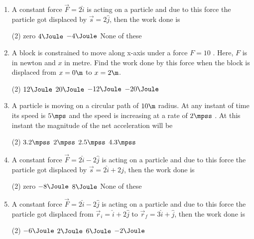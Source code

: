 \documentclass{article}
\begin{document}
\begin{enumerate}
\item A constant force $\vec{F}=2\hat{i}$ is acting on a particle and due to this force the particle got displaced by $\vec{s}=2\hat{j}$, then the work done is
\begin{tasks}(2)
	\task zero\ans
	\task $4\Joule$
	\task $-4\Joule$
	\task None of these
\end{tasks}

\item A block is constrained to move along x-axis under a force $F = 10$ . Here, $F$ is in newton and $x$ in
metre. Find the work done by this force when the block is displaced from $x = 0 \m$ to $x = 2 \m$.
\begin{center}
\end{center}
\begin{tasks}(2)
	\task $12\Joule$
	\task $20\Joule$\ans
	\task $-12\Joule$
	\task $-20\Joule$
\end{tasks}

\item A particle is moving on a circular path of $10 \m$ radius. At any instant of time its speed is $5 \mps$ and the speed is increasing at a rate of $2 \mpss$ . At this instant the magnitude of the net acceleration will be
\begin{tasks}(2)
	\task $3.2\mpss$\ans
	\task $2\mpss$
	\task $2.5\mpss$
	\task $4.3\mpss$
\end{tasks}

\item A constant force $\vec{F}=2\hat{i} - 2\hat{j}$ is acting on a particle and due to this force the particle got displaced by $\vec{s}=2\hat{i} + 2\hat{j}$, then the work done is
\begin{tasks}(2)
	\task zero\ans
	\task $-8\Joule$
	\task $8\Joule$
	\task None of these
\end{tasks}

\item A constant force $\vec{F}=2\hat{i} - 2\hat{j}$ is acting on a particle and due to this force the particle got displaced from $\vec{r}_i=\hat{i} + 2\hat{j}$ to $\vec{r}_f=3\hat{i} + \hat{j}$, then the work done is
\begin{center}
\end{center}
\begin{tasks}(2)
	\task $-6\Joule$
	\task $2\Joule$
	\task $6\Joule$\ans
	\task $-2\Joule$
\end{tasks}
 

\end{enumerate}
\end{document}
